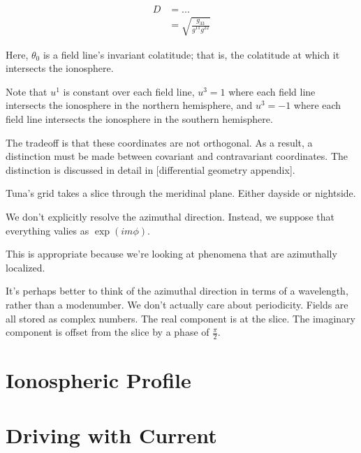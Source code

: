\begin{align}
  \label{def_jacobian}
  D &= ... \\
    &= \sqrt{ \frac{ g_{33} }{ g^{11} g^{22} } }
\end{align}

Here, $\theta_0$ is a field line's invariant colatitude; that is, the
colatitude at which it intersects the ionosphere. 

Note that $u^1$ is constant over each field line, $u^3 = 1$ where each field
line intersects the ionosphere in the northern hemisphere, and $u^3 = -1$ where
each field line intersects the ionosphere in the southern hemisphere. 

The tradeoff is that these coordinates are not orthogonal. As a result, a
distinction must be made between covariant and contravariant coordinates. The
distinction is discussed in detail in [differential geometry appendix].  

Tuna's grid takes a slice through the meridinal plane. Either dayside or nightside. 

We don't explicitly resolve the azimuthal direction. Instead, we suppose that everything valies as $\exp(i m \phi)$. 

This is appropriate because we're looking at phenomena that are azimuthally localized. 

It's perhaps better to think of the azimuthal direction in terms of a wavelength, rather than a modenumber. We don't actually care about periodicity. 
Fields are all stored as complex numbers. The real component is at the slice. The imaginary component is offset from the slice by a phase of $\frac{\pi}{2}$. 

\section{Ionospheric Profile}
  \label{model_ionos_section}






\section{Driving with Current}
  \label{model_driving_section}



















